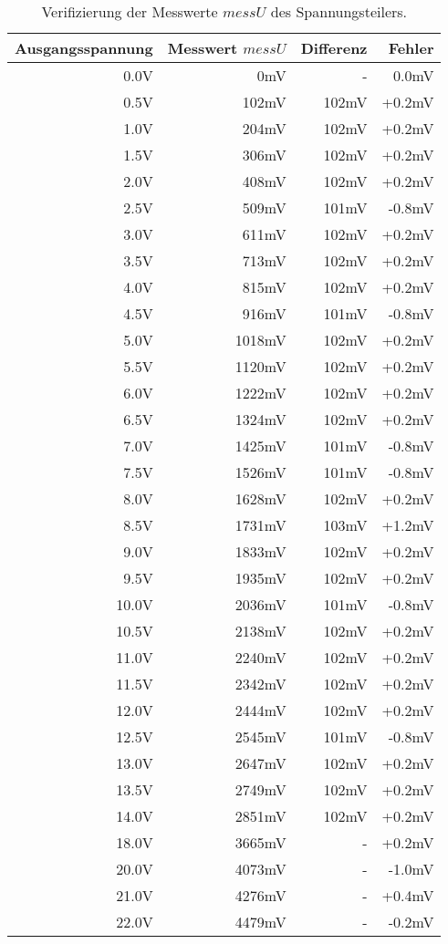 \begin{table}
\centering
\begin{tabular}{|r|r|r|r|}
	\hline
	\textbf{Ausgangsspannung} & \textbf{Messwert $messU$} & \textbf{Differenz} & \textbf{Fehler} \\ \hline
	0.0V & 0mV & - & 0.0mV \\ \hline
	0.5V & 102mV & 102mV & +0.2mV \\ \hline
	1.0V & 204mV & 102mV & +0.2mV \\ \hline
	1.5V & 306mV & 102mV & +0.2mV \\ \hline
	2.0V & 408mV & 102mV & +0.2mV \\ \hline
	2.5V & 509mV & 101mV & -0.8mV \\ \hline
	3.0V & 611mV & 102mV & +0.2mV \\ \hline
	3.5V & 713mV & 102mV & +0.2mV \\ \hline
	4.0V & 815mV & 102mV & +0.2mV \\ \hline
	4.5V & 916mV & 101mV & -0.8mV \\ \hline
	5.0V & 1018mV & 102mV & +0.2mV \\ \hline
	5.5V & 1120mV & 102mV & +0.2mV \\ \hline
	6.0V & 1222mV & 102mV & +0.2mV \\ \hline
	6.5V & 1324mV & 102mV & +0.2mV \\ \hline
	7.0V & 1425mV & 101mV & -0.8mV \\ \hline
	7.5V & 1526mV & 101mV & -0.8mV \\ \hline
	8.0V & 1628mV & 102mV & +0.2mV \\ \hline
	8.5V & 1731mV & 103mV & +1.2mV \\ \hline
	9.0V & 1833mV & 102mV & +0.2mV \\ \hline
	9.5V & 1935mV & 102mV & +0.2mV \\ \hline
	10.0V & 2036mV & 101mV & -0.8mV \\ \hline
	10.5V & 2138mV & 102mV & +0.2mV \\ \hline
	11.0V & 2240mV & 102mV & +0.2mV \\ \hline
	11.5V & 2342mV & 102mV & +0.2mV \\ \hline
	12.0V & 2444mV & 102mV & +0.2mV \\ \hline
	12.5V & 2545mV & 101mV & -0.8mV \\ \hline
	13.0V & 2647mV & 102mV & +0.2mV \\ \hline
	13.5V & 2749mV & 102mV & +0.2mV \\ \hline
	14.0V & 2851mV & 102mV & +0.2mV \\ \hline \hline \hline \hline
	18.0V & 3665mV & - & +0.2mV \\ \hline
	20.0V & 4073mV & - & -1.0mV \\ \hline
	21.0V & 4276mV & - & +0.4mV \\ \hline
	22.0V & 4479mV & - & -0.2mV \\ \hline
\end{tabular}
\caption{Verifizierung der Messwerte $messU$ des Spannungsteilers.}
\label{tab:messU}
\end{table}
